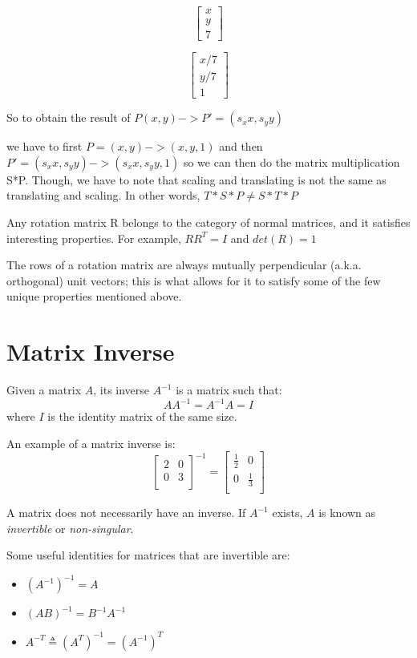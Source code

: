 \documentclass{article}
\begin{document}
\[
  \begin{bmatrix}
    x \\
    y \\
    7
  \end{bmatrix}
\]

\[
    \begin{bmatrix}
    x/7 \\
    y/7 \\
    1
  \end{bmatrix}
  \]

So to obtain the result of
$P(x,y) -> P' = (s_x x, s_y y)$

we have to first $P = (x, y) -> (x,y,1)$ and then $P' = (s_x x, s_y y) -> (s_x x, s_y y, 1)$ so we can then do the matrix multiplication S*P. Though, we have  to note that scaling and translating is not the same as translating and scaling. In other words, $T*S*P \neq S*T*P$

Any rotation matrix R belongs to the category of normal matrices, and it satisfies interesting properties. For example, $R R^T = I$ and $det(R) = 1$

The rows of a rotation matrix are always mutually perpendicular (a.k.a. orthogonal) unit vectors; this is what allows for it to satisfy some of the few unique properties mentioned above.

\section{Matrix Inverse}
Given a matrix $A$, its inverse $A^{-1}$ is a matrix such that:
$$AA^{-1} = A^{-1}A = I$$
where $I$ is the identity matrix of the same size.

An example of a matrix inverse is:
$$
  \begin{bmatrix}
    2 & 0 \\
    0 & 3 \\
  \end{bmatrix}^{-1}
  =
  \begin{bmatrix}
    \frac{1}{2} & 0 \\
    0 & \frac{1}{3} \\
  \end{bmatrix}
$$

A matrix does not necessarily have an inverse. If $A^{-1}$ exists, $A$ is known as \textit{invertible} or \textit{non-singular}.

Some useful identities for matrices that are invertible are:
\begin{itemize}
\item $(A^{-1})^{-1} = A$
\item $(AB)^{-1} = B^{-1}A^{-1}$
\item $A^{-T} \triangleq (A^T)^{-1} = (A^{-1})^T$
\end{itemize}
\end{document}

